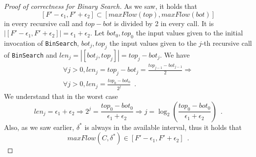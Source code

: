 \begin{proof}[Proof of correctness for Binary Search]
  As we saw, it holds that
  \begin{equation*}
    \left[F' - \epsilon_1, F' + \epsilon_2\right] \subset \left[maxFlow\left(top\right), maxFlow\left(bot\right)\right]
  \end{equation*}
  in every recursive call and $top - bot$ is divided by 2 in every call.
  It is $|[F' - \epsilon_1, F' + \epsilon_2]| = \epsilon_1 + \epsilon_2$. Let
  $bot_0, top_0$ the input values given to the initial invocation of \texttt{BinSearch}, $bot_j,top_j$ the input
  values given to the $j$-th recursive call of \texttt{BinSearch} and $len_j =|[bot_j, top_j]| = top_j - bot_j$. We have
  \begin{equation*}
  \begin{gathered}
    \forall j > 0, len_j = top_j - bot_j = \frac{top_{j-1} - bot_{j-1}}{2} \Rightarrow \\
    \forall j >0, len_j = \frac{top_0 - bot_0}{2^j} \enspace.
  \end{gathered}
  \end{equation*}
  We understand that in the worst case
  \begin{equation*}
    len_j = \epsilon_1 + \epsilon_2 \Rightarrow 2^j = \frac{top_0-bot_0}{\epsilon_1 + \epsilon_2} \Rightarrow
    j = \log_2(\frac{top_0-bot_0}{\epsilon_1+\epsilon_2}) \enspace.
  \end{equation*}
  Also, as we saw earlier, $\delta^*$ is always in the available interval, thus it holds that
  \begin{equation*}
    maxFlow\left(C, \delta^*\right) \in \left[F' - \epsilon_1, F' + \epsilon_2\right] \enspace.
  \end{equation*}
\end{proof}
